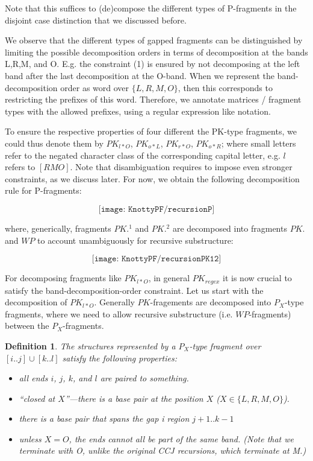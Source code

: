\documentclass[11pt]{article} %
\newtheorem{definition}{Definition}
\begin{document}
Note that this suffices to (de)compose the different types of P-fragments in
the disjoint case distinction that we discussed before.

We observe that the different types of gapped fragments can be distinguished by limiting
the possible decomposition orders in terms of decomposition at the bands L,R,M, and O.
E.g. the constraint (1) is ensured by not decomposing at the left band after the last decomposition at the O-band.
When we represent the band-decomposition order as word over $\{L,R,M,O\}$, then this corresponds to restricting the prefixes of this word. Therefore, we annotate matrices / fragment types with the allowed prefixes, using a regular expression like notation.

To ensure the respective properties of four different the PK-type fragments, we could thus denote them by
$PK_{l*O}$, $PK_{o*L}$, $PK_{r*O}$, $PK_{o*R}$; where small letters refer to the negated character class of the corresponding capital letter, e.g. $l$ refers to $[RMO]$.
% 
Note that disambiguation requires to impose even stronger constraints, as we discuss later.
For now, we obtain the following decomposition rule for P-fragments:

\begin{equation}
\texttt{[image: KnottyPF/recursionP]}
\end{equation}

where, generically, fragments $PK.^1$ and $PK.^2$ are decomposed into fragments $PK.$ and $WP$ to account unambiguously for recursive substructure:

\begin{equation}
\texttt{[image: KnottyPF/recursionPK12]}
\end{equation}

For decomposing fragments like $PK_{l*O}$, in general $PK_{regex}$ it is now crucial to satisfy the band-decomposition-order constraint.
Let us start with the decomposition of $PK_{l*O}$. Generally $PK$-fragements are decomposed into $P_X$-type fragments, where we
need to allow recursive substructure (i.e. $WP$-fragments) between the $P_X$-fragments.

\begin{definition}
The structures represented by a $P_X$-type fragment over $[i..j]\cup [k..l]$ satisfy the following properties:
\begin{itemize}
\item all ends $i$, $j$, $k$, and $l$ are paired to something.
\item ``closed at $X$''---there is a base pair at the position $X$ ($X\in\{L,R,M,O\}$).
\item there is a base pair that spans the gap i region $j+1..k-1$
\item unless $X=O$, the ends cannot all be part of the same band. (Note that we terminate with O, unlike the original CCJ recursions, which terminate at M.)
\end{itemize}
\end{definition}
\end{document}
